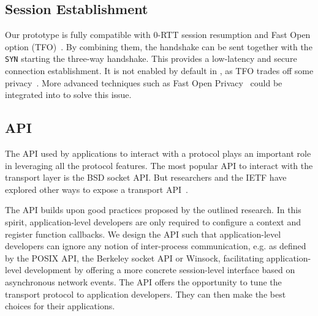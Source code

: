 \subsection{\tcpls Session Establishment}

Our prototype is fully compatible with  0-RTT session resumption
and \tcp Fast Open option (TFO)~\cite{radhakrishnan2011tcp}. By combining them,
the \tcpls handshake can be sent together with the \tcp \texttt{SYN} starting
the three-way handshake. This provides a low-latency and secure connection establishment.
It is not enabled by default in \tcpls, as TFO trades off some privacy~\cite{sy2020enhanced}.
More advanced techniques such as \tcp Fast Open Privacy~\cite{sy2020enhanced}
could be
integrated into \tcpls to solve this issue.

\subsection{\tcpls API}
\label{sec-api}

The API used by applications to interact with a protocol plays an important
role in leveraging all the protocol features. The most popular
API to interact with the transport layer is the BSD socket API.
But researchers and the IETF have explored other ways to expose a transport
API~\cite{draft-ietf-taps-arch,hruby2014sockets,rfc6458,schmidt2013socket}.

The \tcpls API builds upon good practices proposed by the outlined research.
In this spirit, application-level developers are only required to
configure a \tcpls context and register function callbacks.
We design the \tcpls API such
that application-level developers can ignore any notion of inter-process
communication, e.g. as defined by the POSIX API, the Berkeley socket API or
Winsock, facilitating application-level development by offering a more concrete
session-level interface based on asynchronous network events.
The \tcpls API offers the opportunity to tune
the transport protocol to application developers. They can then make the best
choices for their applications.

